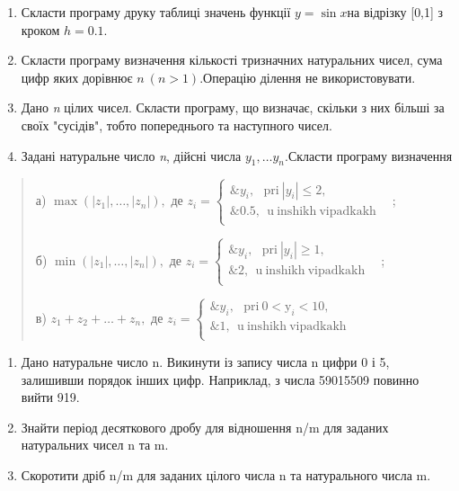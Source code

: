 \documentclass[]{article}
\begin{document}
\begin{enumerate}
\def\labelenumi{\arabic{enumi})}
\item
  Скласти програму друку таблиці значень функції \(y = \sin x\)на
  відрізку {[}0,1{]} з кроком \(h = 0.1.\)
\item
  Скласти програму визначення кількості тризначних натуральних чисел,
  сума цифр яких дорівнює \(n\ (n > 1).\)Операцію ділення не
  використовувати.
\item
  Дано \emph{n} цілих чисел. Скласти програму, що визначає, скільки з
  них більші за своїх "сусідів", тобто попереднього та наступного чисел.
\item
  Задані натуральне число \emph{n}, дійсні числа
  \(y_{1},\ldots y_{n}.\)Скласти програму визначення
\end{enumerate}

\begin{quote}
а) \(\max(\left| z_{1} \right|,\ldots,\left| z_{n} \right|),\) де
\(z_{i} = \left\{ \begin{matrix}
\& y_{i},\mathrm{\ \ \ pri\ }\left| y_{i} \right| \leq 2, \\
\& 0.5,\mathrm{\ \ u\ inshikh\ vipadkakh\ \ \ } \\
\end{matrix} \right.\ \);

б) \(\min(\left| z_{1} \right|,\ldots,\left| z_{n} \right|),\) де
\(z_{i} = \left\{ \begin{matrix}
\& y_{i},\mathrm{\ \ \ pri\ }\left| y_{i} \right| \geq 1, \\
\& 2,\mathrm{\ \ u\ inshikh\ vipadkakh\ \ \ } \\
\end{matrix} \right.\ \);

в) \(z_{1} + z_{2} + \ldots + z_{n},\) де
\(z_{i} = \left\{ \begin{matrix}
\& y_{i},\mathrm{\ \ \ pri\ 0 <}\mathrm{y}_{i} < 10, \\
\& 1,\mathrm{\ \ u\ inshikh\ vipadkakh\ \ \ } \\
\end{matrix} \right.\ \)
\end{quote}

\begin{enumerate}
\def\labelenumi{\arabic{enumi})}
\item
  Дано натуральне число n. Викинути із запису числа n цифри 0 і 5,
  залишивши порядок інших цифр. Наприклад, з числа 59015509 повинно
  вийти 919.
\item
  Знайти період десяткового дробу для відношення n/m для заданих
  натуральних чисел n та m.
\item
  Скоротити дріб n/m для заданих цілого числа n та натурального числа m.
\end{enumerate}
\end{document}
